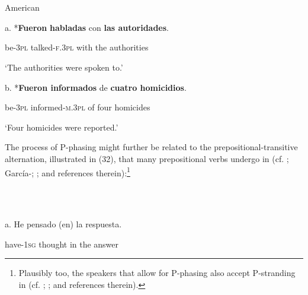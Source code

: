 \documentclass[output=paper]{langsci/langscibook}
\begin{document}
\begin{styleHTMLPreformatted}
\ea%
    \label{ex:key:31}
    \gll\\
        \\
    \glt
    \z

          American 
\end{styleHTMLPreformatted}

\begin{styleHTMLPreformatted}
  a.  *\textbf{Fueron}  \textbf{habladas}          con   \textbf{las  autoridades}.  
\end{styleHTMLPreformatted}

                  be{}-\textsc{3pl}   talked{}-\textsc{f.3pl} with  the  authorities

                       ‘The authorities were spoken to.’

b.   *\textbf{Fueron  informados}              de  \textbf{cuatro homicidios}.

                be{}-\textsc{3pl}   informed-\textsc{m.3pl} of    four     homicides

‘Four homicides were reported.’

\begin{styleHTMLPreformatted}
The process of P-phasing might further be related to the prepositional-transitive alternation, illustrated in (32), that many prepositional verbs undergo in  (cf. \citealt{Demonte1991}; García-\citealt{Miguel1995}; \citealt{Gallego2010}; and references therein):\footnote{Plausibly too, the speakers that allow for P-phasing also accept P-stranding in  (cf. \citet{Depiante2013}; \citealt{Lemos2013}; and references therein).}
\end{styleHTMLPreformatted}

\begin{styleHTMLPreformatted}
\ea%
    \label{ex:key:32}
    \gll\\
        \\
    \glt
    \z

\end{styleHTMLPreformatted}

\begin{styleHTMLPreformatted}
a.   He             pensado (en) la     respuesta.        
\end{styleHTMLPreformatted}

\begin{styleHTMLPreformatted}
        have{}-\textsc{1sg}  thought    in   the   answer
\end{styleHTMLPreformatted}
\end{document}
